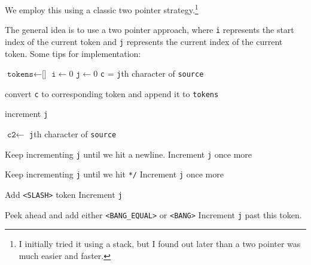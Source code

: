 	We employ this using a classic two pointer strategy.\footnote{I initially tried it using a stack, but I found out later than a two pointer was much easier and faster.}

  \begin{algo}[Scanner]
    The general idea is to use a two pointer approach, where \texttt{i} represents the start index of the current token and \texttt{j} represents the current index of the current token. Some tips for implementation: 

		\begin{algorithmic}[1]  %
				\State $\texttt{tokens} \gets \texttt{[]}$
				\State $\texttt{i} \gets 0$
				\State $\texttt{j} \gets 0$
					\State \texttt{c} = \texttt{j}th character of \texttt{source} 

					   

						\State convert \texttt{c} to corresponding token and append it to \texttt{tokens} 

						\State increment \texttt{j}

					 


						\State $\texttt{c2} \gets$ \texttt{j}th character of \texttt{source}  

						 

							\State Keep incrementing \texttt{j} until we hit a newline. 
							\State Increment \texttt{j} once more

						  

							\State Keep incrementing \texttt{j} until we hit \texttt{*/}
							\State Increment \texttt{j} once more

						\Else {} 
							
							\State Add \texttt{<SLASH>} token
							\State Increment \texttt{j}

						\EndIf

						\State Peek ahead and add either \texttt{<BANG\_EQUAL>} or \texttt{<BANG>}
						\State Increment \texttt{j} past this token. 


\end{algorithmic}
\end{algo}
